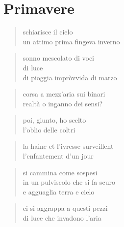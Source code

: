 \chapter*{Primavere}


\begin{verse}
    schiarisce il cielo\\
    un attimo prima fingeva inverno
\end{verse}

\clearpage


\begin{verse}
    sonno mescolato di voci\\
    di luce\\
    di pioggia impròvvida di marzo
\end{verse}

\begin{verse}
    corsa a mezz’aria sui binari\\
    realtà o inganno dei sensi?
\end{verse}

\begin{verse}
    poi, giunto, ho scelto\\
    l’oblio delle coltri
\end{verse}

\clearpage


\begin{otherlanguage}{french}
    \begin{verse}
        la haine et l’ivresse surveillent\\
        l’enfantement d’un jour
    \end{verse}
\end{otherlanguage}

\clearpage


\begin{verse}
    si cammina come sospesi\\
    in un pulviscolo che si fa scuro\\
    e agguaglia terra e cielo
\end{verse}

\begin{verse}
    ci si aggrappa a questi pezzi\\
    di luce che invadono l’aria
\end{verse}


